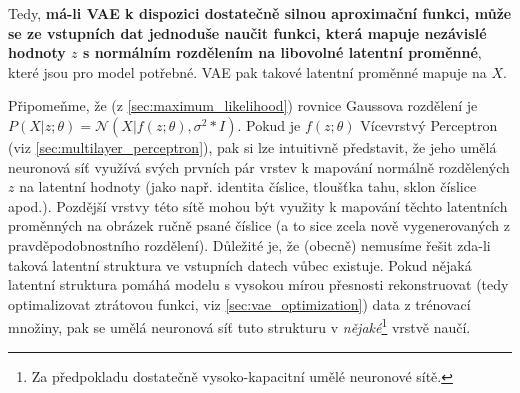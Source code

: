 Tedy, \textbf{má-li VAE k dispozici dostatečně silnou aproximační funkci, může se ze vstupních dat jednoduše naučit funkci, která mapuje nezávislé hodnoty $z$ s normálním rozdělením na libovolné latentní proměnné}, které jsou pro model potřebné.
VAE pak takové latentní proměnné mapuje na $X$.   \cite{Doersch2021}

Připomeňme, že (z \autoref{sec:maximum_likelihood}) rovnice Gaussova rozdělení je $P(X|z;\theta) = \mathcal{N}(X|f(z;\theta), \sigma^2 * I)$.
Pokud je $f(z;\theta)$ Vícevrstvý Perceptron (viz \autoref{sec:multilayer_perceptron}), pak si lze intuitivně představit, že jeho umělá neuronová síť využívá svých prvních pár vrstev k mapování normálně rozdělených $z$ na latentní hodnoty (jako např. identita číslice, tloušťka tahu, sklon číslice apod.).
Pozdější vrstvy této sítě mohou být využity k mapování těchto latentních proměnných na obrázek ručně psané číslice (a to sice zcela nově vygenerovaných z pravděpodobnostního rozdělení).
Důležité je, že (obecně) nemusíme řešit zda-li taková latentní struktura ve vstupních datech vůbec existuje.
Pokud nějaká latentní struktura pomáhá modelu s vysokou mírou přesnosti rekonstruovat (tedy optimalizovat ztrátovou funkci, viz \autoref{sec:vae_optimization}) data z trénovací množiny, pak se umělá neuronová síť tuto strukturu v \emph{nějaké}\footnote{Za předpokladu dostatečně vysoko-kapacitní umělé neuronové sítě.} vrstvě naučí. \cite{Doersch2021}



